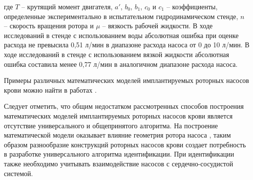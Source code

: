 \noindent где $T$ -- крутящий момент двигателя, $a'$, $b_0$, $b_1$, $c_0$ и $c_1$ -- коэффициенты, определенные экспериментально в испытательном гидродинамическом стенде,  $n$ -- скорость вращения ротора и $\mu$ -- вязкость рабочей жидкости. В ходе исследований в стенде с использованием воды абсолютная ошибка при оценке расхода не превысила 0,51 л/мин в диапазоне расхода насоса от 0 до 10 л/мин. В ходе исследований в стенде с использованием вязкой жидкости абсолютная ошибка составила менее 0,77 л/мин в аналогичном диапазоне расхода насоса.


Примеры различных математических моделей имплантируемых роторных насосов крови можно найти в работах \cite{bioengineering1010022, Moscato_2009, moscato2012evaluation, Pirbodaghi_2011, Pennings_2013, wang2015rotary, wang2015suction, alomari2011non, alomari2009non, gao2012pulsatile, Bakouri_2014, wu2009adaptive, Malagutti_2007, 4352467, Giridharan2003, simaan2009dynamical, choi2007hemodynamic, lim2008noninvasive, yoshizawa2002sensorless, kitamura2000physical, xu2000computer, takami1997flow, ayre2000sensorless}. %

Следует отметить, что общим недостатком рассмотренных способов построения математических моделей имплантируемых роторных насосов крови является отсутствие универсального и общепринятого алгоритма. На построение математической модели оказывает влияние геометрия ротора насоса \cite{ayre2000sensorless}, таким образом разнообразие конструкций роторных насосов крови создает потребность в разработке универсального алгоритма идентификации. При идентификации также необходимо учитывать взаимодействие насосов с сердечно-сосудистой системой. 


